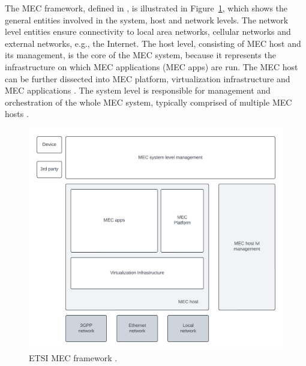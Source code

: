 \documentclass[12pt,a4paper,twoside]{report}
\begin{document}
The MEC framework, defined in \cite{ETSI:GS:MEC003}, is illustrated in Figure~\ref{F:MEC-fw}, which shows the general entities involved in the system, host and network levels. The network level entities ensure connectivity to local area networks, cellular networks and external networks, e.g., the Internet. The host level, consisting of MEC host and its management, is the core of the MEC system, because it represents the infrastructure on which MEC applications (MEC apps) are run. The MEC host can be further dissected into MEC platform, virtualization infrastructure and MEC applications \cite{ETSI:GS:MEC003}. The system level is responsible for management and orchestration of the whole MEC system, typically comprised of multiple MEC hosts \cite{ETSI:GS:MEC003,sabella-mec-sw-dev}. 

\begin{figure}[ht]
	\centering
	\includegraphics[width=12cm]{./images/MEC-framework.png}
	\caption{ETSI MEC framework \cite{ETSI:GS:MEC003}.}
	\label{F:MEC-fw}
\end{figure}
\end{document}
